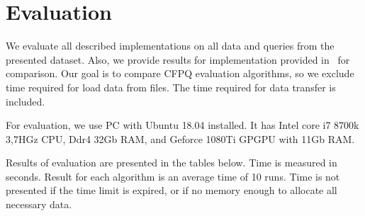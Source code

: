 \section{Evaluation}

We evaluate all described implementations on all data and queries from the presented dataset.
Also, we provide results for implementation provided in~\cite{Azimov:2018:CPQ:3210259.3210264} for comparison.
Our goal is to compare CFPQ evaluation algorithms, so we exclude time required for load data from files.
The time required for data transfer is included.

For evaluation, we use PC with Ubuntu 18.04 installed.
It has Intel core i7 8700k 3,7HGz CPU, Ddr4 32Gb RAM, and Geforce 1080Ti GPGPU with 11Gb RAM.

Results of evaluation are presented in the tables below.
Time is measured in seconds.
Result for each algorithm is an average time of 10 runs.
Time is not presented if the time limit is expired, or if no memory enough to allocate all necessary data.

